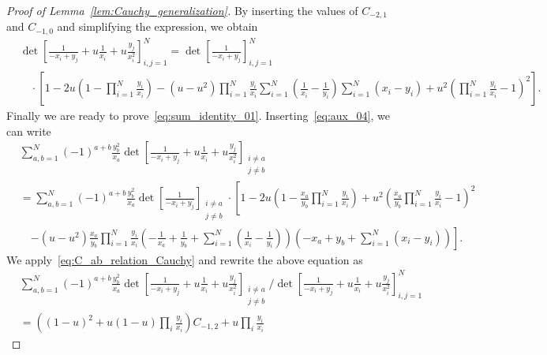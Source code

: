 \documentclass[10pt,a4paper]{amsart}
\begin{document}
\begin{proof}[Proof of Lemma~\ref{lem:Cauchy_generalization}]
By inserting the values of $C_{-2,1}$ and $C_{-1,0}$ and simplifying the expression, we obtain
\begin{equation}
	\label{eq:aux_04}
	\begin{split}
		&\det\left[  \frac{1}{-x_i+y_j} +u \frac{1}{x_i} +u \frac{y_j}{x_i^2} \right]_{i,j=1}^N =  \det\left[\frac{1}{-x_i+y_j}\right]_{i,j=1}^N\\
		&\quad \cdot \left[
		1 - 2u\left( 1-\prod_{i=1}^N \frac{y_i}{x_i}\right) -(u-u^2)\prod_{i=1}^N \frac{y_i}{x_i}\sum_{i=1}^N\left(\frac{1}{x_i}-\frac{1}{y_i}\right)\sum_{i=1}^N (x_i-y_i) + u^2 \left(\prod_{i=1}^N \frac{y_i}{x_i}-1\right)^2
		\right].
	\end{split}
\end{equation}
Finally we are ready to prove~\eqref{eq:sum_identity_01}. Inserting~\eqref{eq:aux_04}, we can write
\begin{equation*}
	\begin{split}
		&\sum_{a,b=1}^N (-1)^{a+b} \frac{y_b^2}{x_a} 
		\det\left[  \frac{1}{-x_i+y_j} +u \frac{1}{x_i} +u \frac{y_j}{x_i^2} \right]_{\substack{i\ne a\\ j\ne b}}\\
		&=\sum_{a,b=1}^N (-1)^{a+b} \frac{y_b^2}{x_a} \det\left[\frac{1}{-x_i+y_j}\right]_{\substack{i\ne a\\ j\ne b}}
		\cdot \left[
		1 - 2u\left( 1-\frac{x_a}{y_b}\prod_{i=1}^N \frac{y_i}{x_i}\right)
		 + u^2 \left(\frac{x_a}{y_b}\prod_{i=1}^N \frac{y_i}{x_i}-1\right)^2\right.\\
		&\quad\left. -(u-u^2)\frac{x_a}{y_b}\prod_{i=1}^N \frac{y_i}{x_i}
		\left(-\frac{1}{x_a}+\frac{1}{y_b}+
		\sum_{i=1}^N\left(\frac{1}{x_i}-\frac{1}{y_i}\right)\right)
		\left(-x_a+y_b+ \sum_{i=1}^N (x_i-y_i)\right)
		\right].
	\end{split}
\end{equation*}
We apply~\eqref{eq:C_ab_relation_Cauchy} and rewrite the above equation as
\begin{equation}
	\begin{split}
		&\sum_{a,b=1}^N 
		    (-1)^{a+b} \frac{y_b^2}{x_a} 
		        \det\left[
		               \frac{1}{-x_i+y_j} +u \frac{1}{x_i} +u \frac{y_j}{x_i^2} 
		            \right]_{\substack{i\ne a\\ j\ne b}}
		       /\det\left[
		              \frac{1}{-x_i+y_j} +u \frac{1}{x_i} +u \frac{y_j}{x_i^2} 
		            \right]_{i,j=1}^N\\
	  &=\left(
	         (1-u)^2 +u(1-u)\prod_i\frac{y_i}{x_i}
	    \right)C_{-1,2}
	    +u\prod_i\frac{y_i}{x_i}

\end{split}
\end{equation}
\end{proof}
\end{document}
